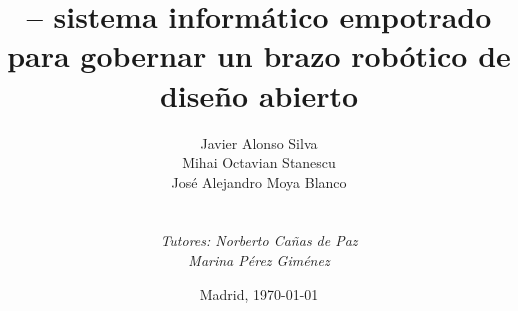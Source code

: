 
\def\Company{Consultancy}
\def\Institute{\textit{Universidad Politécnica de Madrid}\\ \textit{Escuela Técnica Superior de Ingeniería de Sistemas Informáticos}}
\def\Course{\textit{Grado en Ingeniería de Computadores}}
\def\Module{\textit{Trabajo de Fin de Grado}}
\def\Docent{\textit{Tutores: Norberto Cañas de Paz} \\ \textit{Marina Pérez Giménez}}
\def\Assistant{}


\def\Subtitle{\pArm{} -- sistema informático empotrado para gobernar un brazo robótico de diseño abierto}
\def\Authors{Javier Alonso Silva \\ Mihai Octavian Stanescu \\ José Alejandro Moya Blanco } 
\def\Shortname{J. Alonso, M. Stanescu, A. Moya}


\title{\Subtitle}
\author{\Authors \\ \\ \\ \Docent}
\date{Madrid, \today{}}

